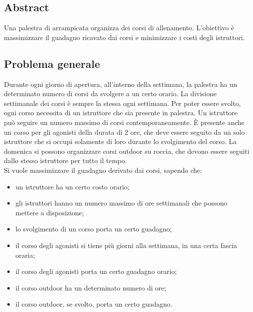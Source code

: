 \subsection{Abstract}
Una palestra di arrampicata organizza dei corsi di allenamento. L'obiettivo è massimizzare il guadagno ricavato dai corsi e minimizzare i costi degli istruttori.

\subsection{Problema generale}
Durante ogni giorno di apertura, all'interno della settimana, la palestra ha un determinato numero di corsi da svolgere a un certo orario. La divisione settimanale dei corsi è sempre la stessa ogni settimana. Per poter essere svolto, ogni corso necessita di un istruttore che sia presente in palestra. Un istruttore può seguire un numero massimo di corsi contemporaneamente. È presente anche un corso per gli agonisti della durata di 2 ore, che deve essere seguito da un solo istruttore che si occupi solamente di loro durante lo svolgimento del corso. La domenica si possono organizzare corsi outdoor su roccia, che devono essere seguiti dallo stesso istruttore per tutto il tempo. \\
Si vuole massimizzare il guadagno derivato dai corsi, sapendo che:
\begin{itemize}
	\item un istruttore ha un certo costo orario;
	\item gli istruttori hanno un numero massimo di ore settimanali che possono mettere a disposizione;
	\item lo svolgimento di un corso porta un certo guadagno;
	\item il corso degli agonisti si tiene più giorni alla settimana, in una certa fascia oraria;
	\item il corso degli agonisti porta un certo guadagno orario;
	\item il corso outdoor ha un determinato numero di ore;
	\item il corso outdoor, se svolto, porta un certo guadagno.
\end{itemize}
